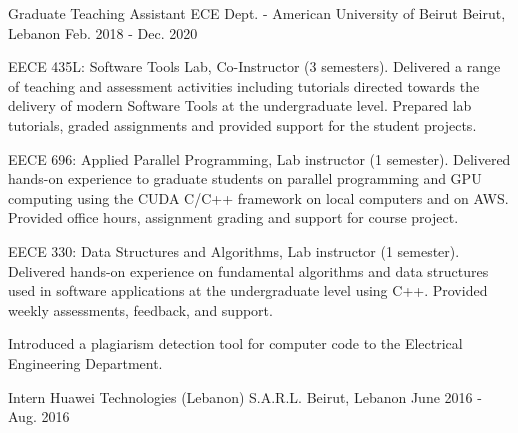 \begin{cventries}
  \cventry
    {Graduate Teaching Assistant} %
    {ECE Dept. - American University of Beirut} %
    {Beirut, Lebanon} %
    {Feb. 2018 - Dec. 2020} %
    {
      \begin{cvitems} %
        \item {EECE 435L: Software Tools Lab, Co-Instructor (3 semesters).  Delivered a range of teaching and assessment activities including tutorials directed towards the delivery of modern Software Tools at the undergraduate level. Prepared lab tutorials, graded assignments and provided support for the student projects.}
        \item {EECE 696: Applied Parallel Programming, Lab instructor (1 semester). Delivered hands-on experience to graduate students on parallel programming and GPU computing using the CUDA C/C++ framework on local computers and on AWS. Provided office hours, assignment grading and support for course project.}
        \item {EECE 330: Data Structures and Algorithms, Lab instructor (1 semester). Delivered hands-on experience on fundamental algorithms and data structures used in software applications at the undergraduate level using C++. Provided weekly assessments, feedback, and support.}
        \item{Introduced a plagiarism detection tool for computer code to the Electrical Engineering Department.}
      \end{cvitems}
    }

  \cventry
    {Intern} %
    {Huawei Technologies (Lebanon) S.A.R.L.} %
    {Beirut, Lebanon} %
    {June 2016  - Aug. 2016} %
    {
    }

\end{cventries}
